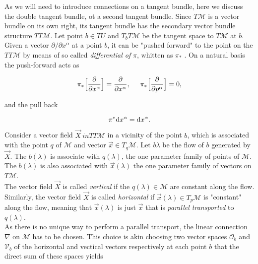 \documentclass[11pt,a4paper,headinclude=true,DIV=14,BCOR=8mm,chapterprefix,listof=totoc,twoside,openright,abstracton]{scrbook}
\begin{document}
As we will need to introduce connections on a tangent bundle, here we discuss the double tangent bundle, ot a second tangent bundle. Since $T\mathcal{M}$ is a vector bundle on its own right, its tangent bundle has the secondary vector bundle structure $TT\mathcal{M}$. Let point $b\in TU$ and $T_b T\mathcal{M}$ be the tangent space to $T\mathcal{M}$ at $b$. \\
Given a vector $\partial/\partial x^{\alpha}$ at a point $b$, it can be "pushed forward" to the point on the $TT\mathcal{M}$ by means of so called \textit{differential of} $\pi$, whitten as $\pi_*$ \cite{Frankel:2002}.
On a natural basis the push-forward acts as 

\begin{equation}
    \pi_*\Big[\frac{\partial}{\partial x^{\alpha}}\Big] = \frac{\partial}{\partial x^{\alpha}}, \hspace{5mm} \pi_* \Big[\frac{\partial}{\partial p^{\alpha}}\Big] = 0,
\end{equation}

and the pull back 

\begin{equation}
    \pi^* {\text d} x^{\alpha} = {\text d} x^{\alpha}.
\end{equation}

Consider a vector field $\vec{X} \ in TT\mathcal{M}$  in a vicinity of the point $b$, which is associated with the point $q$ of $\mathcal{M}$ and vector $\vec{x}\in T_{q}\mathcal{M}$. Let $b{\lambda}$ be the flow of $b$ generated by $\vec{X}$. The $b(\lambda)$ is associate with $q(\lambda)$, the one parameter family of points of $\mathcal{M}$. The $b(\lambda)$ is also associated with $\vec{x}(\lambda)$ the one parameter family of vectors on $T\mathcal{M}$.  \\

The vector field $\vec{X}$ is called \textit{vertical} if the $q(\lambda)\in\mathcal{M}$ are constant along the flow. Similarly, the vector field $\vec{X}$ is called \textit{horizontal} if $\vec{x}(\lambda)\in T_p \mathcal{M}$ is "constant" along the flow, meaning that $\vec{x}(\lambda)$ is just $\vec{x}$ that is \textit{parallel transported} to $q(\lambda)$. \\
As there is no unique way to perform a parallel transport, the linear connection $\nabla$ on $\mathcal{M}$ has to be chosen. This choice is akin choosing two vector spaces $\mathcal{O}_b$ and $\mathcal{V}_b$ of the horizontal and vectical vectors respectively at each point $b$ that the direct sum of these spaces yields
\end{document}
